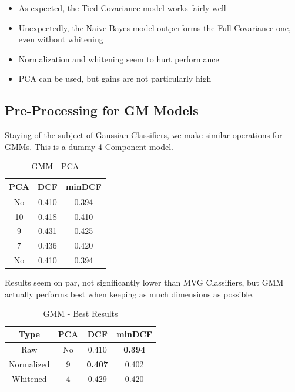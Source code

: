 \documentclass[twocolumn]{article}
\begin{document}
\begin{itemize}
    \item As expected, the Tied Covariance model works fairly well
    \item Unexpectedly, the Naive-Bayes model outperforms the Full-Covariance one, even without whitening
    \item Normalization and whitening seem to hurt performance
    \item PCA can be used, but gains are not particularly high
\end{itemize}

\subsection{Pre-Processing for GM Models}

Staying of the subject of Gaussian Classifiers, we make similar operations for GMMs. 
This is a dummy 4-Component model.

\begin{table}[H]
    \centering
        \begin{tabular}{||c|c|c||}
            \hline
            PCA & DCF & minDCF \\
            \hline
            \hline
             No & 0.410  & 0.394 \\ 
             10 & 0.418  & 0.410 \\ 
             9 & 0.431  & 0.425 \\ 
             7 & 0.436  & 0.420 \\ 
            \hline
             No & 0.410  & 0.394 \\ 
            \hline
    \end{tabular}
    \caption{GMM - PCA}
\end{table}

Results seem on par, not significantly lower than MVG Classifiers, but GMM actually performs best when keeping as much dimensions as possible.

\begin{table}[H]
    \centering
        \begin{tabular}{||c|c|c|c||}
            \hline
            Type & PCA & DCF & minDCF \\
            \hline
            \hline
            Raw & No & 0.410 & {\bf 0.394}  \\
            Normalized &  9 & {\bf 0.407} & 0.402 \\
            Whitened & 4 & 0.429 & 0.420 \\
            \hline
    \end{tabular}
    \caption{GMM - Best Results}
\end{table}
\end{document}
